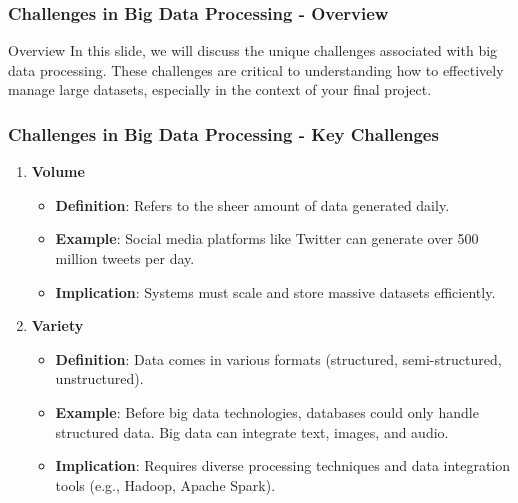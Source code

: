 \documentclass[aspectratio=169]{beamer}
\begin{document}
\begin{frame}[fragile]
    \frametitle{Challenges in Big Data Processing - Overview}
    \begin{block}{Overview}
        In this slide, we will discuss the unique challenges associated with big data processing. These challenges are critical to understanding how to effectively manage large datasets, especially in the context of your final project.
    \end{block}
\end{frame}

\begin{frame}[fragile]
    \frametitle{Challenges in Big Data Processing - Key Challenges}
    \begin{enumerate}
        \item \textbf{Volume}
            \begin{itemize}
                \item \textbf{Definition}: Refers to the sheer amount of data generated daily.
                \item \textbf{Example}: Social media platforms like Twitter can generate over 500 million tweets per day.
                \item \textbf{Implication}: Systems must scale and store massive datasets efficiently.
            \end{itemize}
        \item \textbf{Variety}
            \begin{itemize}
                \item \textbf{Definition}: Data comes in various formats (structured, semi-structured, unstructured).
                \item \textbf{Example}: Before big data technologies, databases could only handle structured data. Big data can integrate text, images, and audio.
                \item \textbf{Implication}: Requires diverse processing techniques and data integration tools (e.g., Hadoop, Apache Spark).
            \end{itemize}
    \end{enumerate}
\end{frame}
\end{document}
